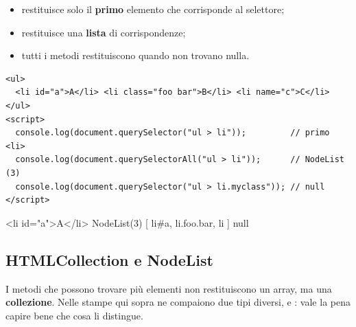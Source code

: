 \begin{itemize}
  \item {} restituisce solo il \textbf{primo} elemento che
        corrisponde al selettore;
  \item {} restituisce una \textbf{lista} di
        corrispondenze;
  \item tutti i metodi restituiscono  quando non trovano nulla.
\end{itemize}

\begin{affianco}[0.62][c]
\codicepiccolo
\begin{lstlisting}[style=html, name=queryselector.html]
<ul>
  <li id="a">A</li> <li class="foo bar">B</li> <li name="c">C</li>
</ul>
<script>
  console.log(document.querySelector("ul > li"));         // primo <li>
  console.log(document.querySelectorAll("ul > li"));      // NodeList (3)
  console.log(document.querySelector("ul > li.myclass")); // null
</script>
\end{lstlisting}
\risultato
\begin{console}
<li id="a">A</li>
NodeList(3) [ li#a, li.foo.bar,
  li ]
null
\end{console}
\end{affianco}

\subsection{HTMLCollection e NodeList}

I metodi che possono trovare più elementi non restituiscono un array, ma una
\textbf{collezione}. Nelle stampe qui sopra ne compaiono due tipi diversi,
 e : vale la pena capire bene che cosa li
distingue.

